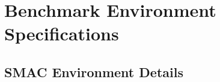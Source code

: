         
        










\newpage

\chapter{Benchmark Environment Specifications}
\section{SMAC Environment Details}


